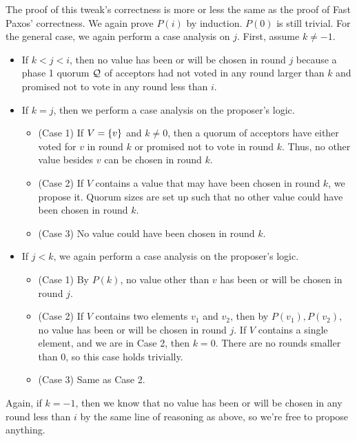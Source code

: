 The proof of this tweak's correctness is more or less the same as the proof of
Fast Paxos' correctness. We again prove $P(i)$ by induction. $P(0)$ is still
trivial. For the general case, we again perform a case analysis on $j$. First,
assume $k \neq -1$.
\begin{itemize}
  \item
    If $k < j < i$, then no value has been or will be chosen in round $j$
    because a phase 1 quorum $\mathcal{Q}$ of acceptors had not voted in any round
    larger than $k$ and promised not to vote in any round less than $i$.

  \item
    If $k = j$, then we perform a case analysis on the proposer's logic.
    \begin{itemize}
      \item
        (Case 1) If $V = \{v\}$ and $k \neq 0$, then a quorum of acceptors
        have either voted for $v$ in round $k$ or promised not to vote in round
        $k$. Thus, no other value besides $v$ can be chosen in round $k$.
      \item
        (Case 2) If $V$ contains a value that may have been chosen in round
        $k$, we propose it. Quorum sizes are set up such that no other value
        could have been chosen in round $k$.
      \item
        (Case 3) No value could have been chosen in round $k$.
    \end{itemize}

  \item
    If $j < k$, we again perform a case analysis on the proposer's logic.
    \begin{itemize}
      \item
        (Case 1) By $P(k)$, no value other than $v$ has been or will be chosen
        in round $j$.
      \item
        (Case 2) If $V$ contains two elements $v_1$ and $v_2$, then by $P(v_1),
        P(v_2)$, no value has been or will be chosen in round $j$. If $V$
        contains a single element, and we are in Case 2, then $k = 0$. There
        are no rounds smaller than $0$, so this case holds trivially.
      \item
        (Case 3) Same as Case 2.
    \end{itemize}
\end{itemize}
Again, if $k = -1$, then we know that no value has been or will be chosen in
any round less than $i$ by the same line of reasoning as above, so we're free
to propose anything.

